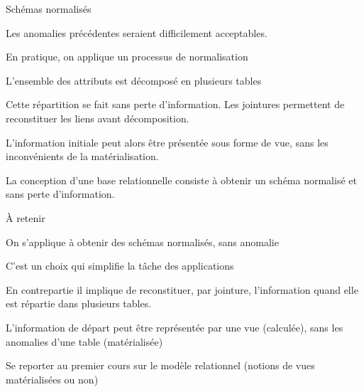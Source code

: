 \begin{frame}{Schémas normalisés}

Les anomalies précédentes seraient  difficilement acceptables.

\vfill

En pratique, on applique 
un processus de \alert{normalisation}

\begin{redbullet}
  \item L'ensemble des attributs est \alert{décomposé} en plusieurs tables
  \item Cette répartition se fait \alert{sans perte d'information}. 
     Les \alert{jointures} permettent de reconstituer les liens avant décomposition.
     
   \item L'information initiale peut alors être présentée sous  forme de \alert{vue},
     sans les inconvénients de la matérialisation.
\end{redbullet}
 
 \vfill
 La conception d'une base relationnelle consiste à obtenir un schéma normalisé
 et sans perte d'information. 
\end{frame}




\begin{frame}{À retenir}

On s'applique à obtenir des schémas normalisés, sans anomalie
\vfill
\begin{redbullet}
  \item C'est un choix qui simplifie la tâche des applications
  \item En contrepartie il implique de reconstituer, par jointure, l'information
     quand elle est répartie dans plusieurs tables.
   \item L'information de départ peut être représentée par une vue
       (\alert{calculée}), sans les anomalies d'une table (\alert{matérialisée})
 \end{redbullet}

\vfill

Se reporter au premier cours sur le modèle relationnel (notions
de vues matérialisées ou non)
\end{frame}

